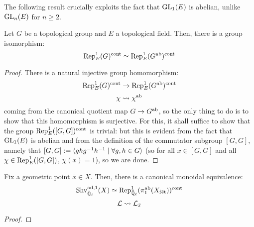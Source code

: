        The following result crucially exploits the fact that $\operatorname{GL}_1(E)$ is abelian, unlike $\operatorname{GL}_n(E)$ for $n \geq 2$.
        \begin{lemma} \label{lemma: abelianising_continuous_characters}
            Let $G$ be a topological group and $E$ a topological field. Then, there is a group isomorphism:
                $$\mathrm{Rep}^1_E(G)^{\mathrm{cont}} \simeq \mathrm{Rep}^1_E(G^{\mathrm{ab}})^{\mathrm{cont}}$$
        \end{lemma}
            \begin{proof}
                There is a natural injective group homomorphism:
                    $$\mathrm{Rep}^1_E(G)^{\mathrm{cont}} \to \mathrm{Rep}^1_E(G^{\mathrm{ab}})^{\mathrm{cont}}$$
                    $$\chi \leadsto \chi^{\mathrm{ab}}$$
                coming from the canonical quotient map $G \to G^{\mathrm{ab}}$, so the only thing to do is to show that this homomorphism is surjective. For this, it shall suffice to show that the group $\mathrm{Rep}^1_E([G, G])^{\mathrm{cont}}$ is trivial: but this is evident from the fact that $\operatorname{GL}_1(E)$ is abelian and from the definition of the commutator subgroup $[G, G]$, namely that $[G, G] := \langle ghg^{-1}h^{-1} \mid \forall g, h \in G\rangle$ (so for all $x \in [G, G]$ and all $\chi \in \mathrm{Rep}^1_E([G, G])$, $\chi(x) = 1$), so we are done.
            \end{proof}
            
        \begin{theorem} \label{theorem: galois_representations_are_sheaves_on_X}
            Fix a geometric point $\bar{x} \in X$. Then, there is a canonical monoidal equivalence:
                $$\mathrm{Shv}_{\bar{\mathbb{Q}}_{\ell}}^{\mathrm{ad}, 1}(X) \simeq \mathrm{Rep}^1_{\bar{\mathbb{Q}}_{\ell}}(\pi_1^{\mathrm{ab}}(X_{\mathrm{f\acute{e}t}}))^{\mathrm{cont}}$$
                $$\mathcal{L} \leadsto \mathcal{L}_{\bar{x}}$$
        \end{theorem}
            \begin{proof}
                
            \end{proof}